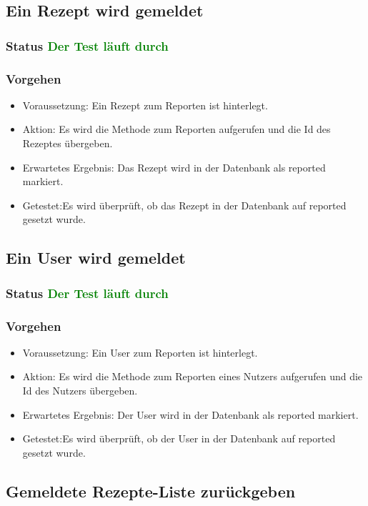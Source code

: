 \subsection{Ein Rezept wird gemeldet}
\subsubsection{Status \textcolor{green}{ Der Test läuft durch} }
\subsubsection{Vorgehen}
\begin{itemize}
	\item Voraussetzung: Ein Rezept zum Reporten ist hinterlegt.
	\item Aktion: Es wird die Methode zum Reporten aufgerufen und die Id des Rezeptes übergeben.
	\item Erwartetes Ergebnis: Das Rezept wird in der Datenbank als reported markiert.
	\item Getestet:Es wird überprüft, ob das Rezept in der Datenbank auf reported gesetzt wurde.
\end{itemize}

\subsection{Ein User wird gemeldet}
\subsubsection{Status \textcolor{green}{ Der Test läuft durch} }
\subsubsection{Vorgehen}
\begin{itemize}
	\item Voraussetzung: Ein User zum Reporten ist hinterlegt.
	\item Aktion: Es wird die Methode zum Reporten eines Nutzers aufgerufen und die Id des Nutzers übergeben.
	\item Erwartetes Ergebnis: Der User wird in der Datenbank als reported markiert.
	\item Getestet:Es wird überprüft, ob der User in der Datenbank auf reported gesetzt wurde.
\end{itemize}



\subsection{Gemeldete Rezepte-Liste zurückgeben}
